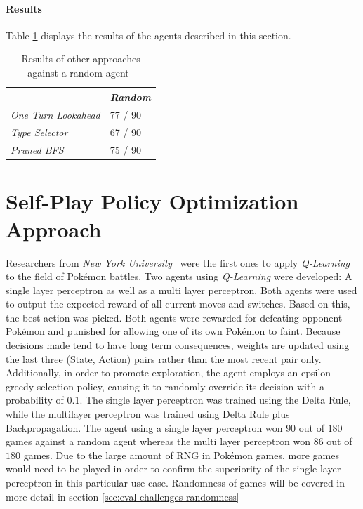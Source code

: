 \paragraph{Results}
Table \ref{tbl:AI-Comp-Results} displays the results of the agents described in this section.
\begin{table}[h]
    \centering
        \begin{tabular}{|l|l|}
            \hline
            & \emph{Random} \\
            \hline
            \emph{One Turn Lookahead} & 77 / 90 \\
            \hline
            \emph{Type Selector} & 67 / 90 \\
            \hline
            \emph{Pruned \ac{BFS}} & 75 / 90 \\
            \hline
        \end{tabular}
        \caption{Results of other approaches against a random agent~\autocite{Lee_Togelius_2017}}
        \label{tbl:AI-Comp-Results}
\end{table}

\section{Self-Play Policy Optimization Approach}
Researchers from \textit{New York University}~\autocite{Lee_Togelius_2017} were the first ones to apply
\textit{Q-Learning} to the field of Pokémon battles. Two agents using \textit{Q-Learning}
were developed: A single layer perceptron as well as a multi layer perceptron. Both agents were 
used to output the expected reward of all current moves and switches. Based on this, the best 
action was picked. Both agents were rewarded for defeating opponent Pokémon and punished for 
allowing one of its own Pokémon to faint. Because decisions made tend to have long term consequences, 
weights are updated using the last three (State, Action) pairs rather than the most recent pair only.
Additionally, in order to promote exploration, the agent employs an epsilon-greedy selection policy, 
causing it to randomly override its decision with a probability of 0.1. The single layer perceptron 
was trained using the Delta Rule, while the multilayer perceptron was trained using Delta Rule 
plus Backpropagation. The agent using a single layer perceptron won $90$ out of $180$ games against a
random agent whereas the multi layer perceptron won 86 out of $180$ games. Due to the large amount
of \ac{RNG} in Pokémon games, more games would need to be played in order to confirm the superiority
of the single layer perceptron in this particular use case. Randomness of games will be covered
in more detail in section \ref{sec:eval-challenges-randomness}\\

